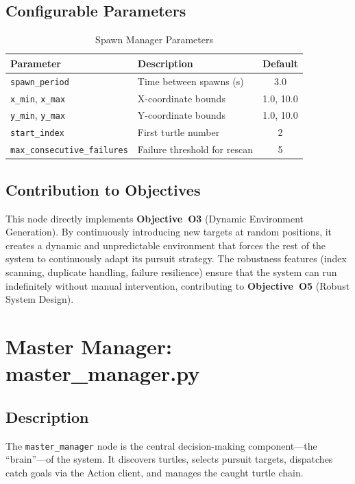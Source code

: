 \subsection{Configurable Parameters}

\begin{table}[htbp]
\centering
\caption{Spawn Manager Parameters}
\begin{tabular}{llc}
\toprule
\textbf{Parameter} & \textbf{Description} & \textbf{Default} \\
\midrule
\texttt{spawn\_period} & Time between spawns (s) & 3.0 \\
\texttt{x\_min}, \texttt{x\_max} & X-coordinate bounds & 1.0, 10.0 \\
\texttt{y\_min}, \texttt{y\_max} & Y-coordinate bounds & 1.0, 10.0 \\
\texttt{start\_index} & First turtle number & 2 \\
\texttt{max\_consecutive\_failures} & Failure threshold for rescan & 5 \\
\bottomrule
\end{tabular}
\end{table}

\subsection{Contribution to Objectives}

This node directly implements \textbf{Objective~O3} (Dynamic Environment Generation). By continuously introducing new targets at random positions, it creates a dynamic and unpredictable environment that forces the rest of the system to continuously adapt its pursuit strategy. The robustness features (index scanning, duplicate handling, failure resilience) ensure that the system can run indefinitely without manual intervention, contributing to \textbf{Objective~O5} (Robust System Design).

\section{Master Manager: master\_manager.py}

\subsection{Description}

The \texttt{master\_manager} node is the central decision-making component---the ``brain''---of the system. It discovers turtles, selects pursuit targets, dispatches catch goals via the Action client, and manages the caught turtle chain.

